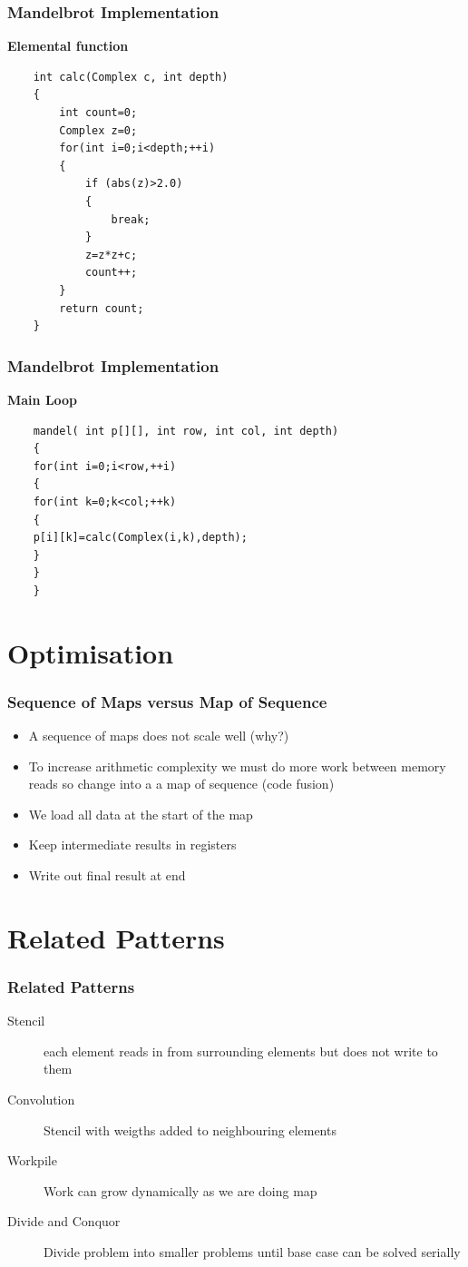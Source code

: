 \documentclass{beamer}
\begin{document}
\begin{frame}[fragile=singleslide]
	\frametitle{Mandelbrot Implementation}
	
	\textbf{Elemental function}
	\begin{lstlisting}
	int calc(Complex c, int depth)
	{
		int count=0;
		Complex z=0;
		for(int i=0;i<depth;++i)
		{
			if (abs(z)>2.0)
			{
				break;
			}
			z=z*z+c;
			count++;
		}
		return count;
	}
	\end{lstlisting}
\end{frame}

\begin{frame}[fragile=singleslide]
	\frametitle{Mandelbrot Implementation}
	
	\textbf{Main Loop}
	\begin{lstlisting}
	mandel( int p[][], int row, int col, int depth)
	{
	for(int i=0;i<row,++i)
	{
	for(int k=0;k<col;++k)
	{
	p[i][k]=calc(Complex(i,k),depth);
	}
	}
	}
	\end{lstlisting}
\end{frame}

\section{Optimisation}
\begin{frame}
	\frametitle{Sequence of Maps versus Map of Sequence}
\begin{itemize}
	\item A sequence of maps does not scale well (why?)
	\item To increase arithmetic complexity we must do more work between memory reads
so change into a a map of sequence (code fusion)
	\item We load all data at the start of the map
	\item Keep intermediate results in registers
	\item Write out final result at end
\end{itemize}
\end{frame}
\section{Related Patterns}
\begin{frame}
	\frametitle{Related Patterns}
\begin{description}
	\item[Stencil] each element reads in from surrounding elements but does not write to them
	\item[Convolution]	Stencil with weigths added to neighbouring elements
	\item[Workpile]	Work can grow dynamically as we are doing map
	\item[Divide and Conquor] Divide problem into smaller problems until base case can be solved serially
\end{description}
\end{frame}
 
 
 
 
\end{document}

